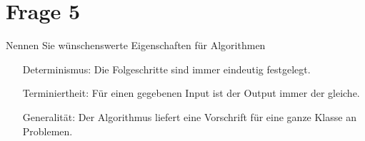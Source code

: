 \documentclass{scrartcl}[10pt]
\begin{document}
\section*{Frage 5}
Nennen Sie w\"unschenswerte Eigenschaften f\"ur Algorithmen
\begin{itemize}

\item[Determinismus:] Die Folgeschritte sind immer eindeutig festgelegt. 

\item[Terminiertheit:] F\"ur einen gegebenen Input ist der Output immer der gleiche.

\item[Generalit\"at:] Der Algorithmus liefert eine Vorschrift f\"ur eine ganze Klasse an Problemen.

\end{itemize}
\end{document}

